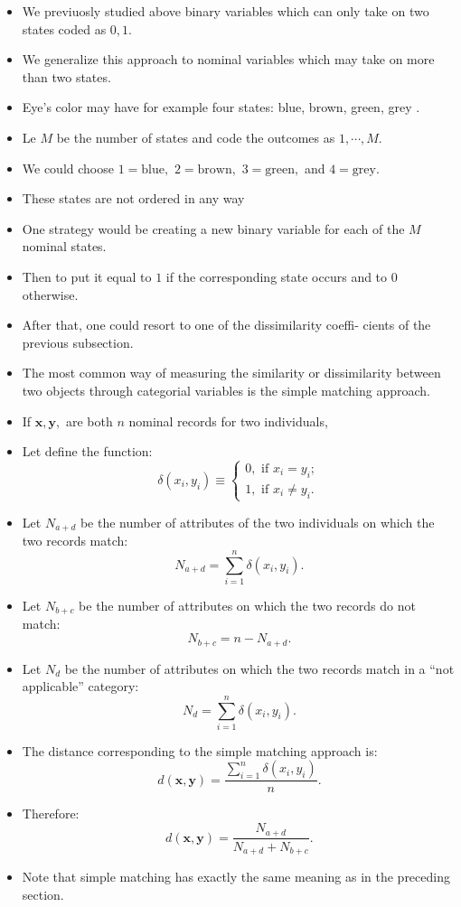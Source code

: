 \documentclass[
]{article}
\begin{document}
\begin{itemize}
\item
  We previuosly studied above binary variables which can only take on
  two states coded as \(0,1\).
\item
  We generalize this approach to nominal variables which may take on
  more than two states.
\item
  Eye's color may have for example four states: blue, brown, green, grey
  .
\item
  Le \(M\) be the number of states and code the outcomes as
  \(1, \cdots, M\).
\item
  We could choose \(1 =\text{blue},\) \(2 =\text{brown},\)
  \(3 =\text{green},\) and \(4 =\text{grey}\).
\item
  These states are not ordered in any way
\item
  One strategy would be creating a new binary variable for each of the
  \(M\) nominal states.
\item
  Then to put it equal to \(1\) if the corresponding state occurs and to
  \(0\) otherwise.
\item
  After that, one could resort to one of the dissimilarity coeffi-
  cients of the previous subsection.
\item
  The most common way of measuring the similarity or dissimilarity
  between two objects through categorial variables is the simple
  matching approach.
\item
  If \(\mathbf{x},\mathbf{y},\) are both \(n\) nominal records for two
  individuals,
\item
  Let define the function: \[\delta(x_i,y_i)\equiv \begin{cases}0,
  \text{ if } x_i=y_i;\\1,\text{ if } x_i \neq y_i.\end{cases}\]
\item
  Let \(N_{a+d}\) be the number of attributes of the two individuals on
  which the two records match: \[N_{a+d}=\sum_{i=1}^n\delta(x_i,y_i).\]
\item
  Let \(N_{b+c}\) be the number of attributes on which the two records
  do not match: \[N_{b+c}= n - N_{a+d}.\]
\item
  Let \(N_d\) be the number of attributes on which the two records match
  in a ``not applicable'' category:
  \[N_{d}=\sum_{i=1}^n\delta(x_i,y_i).\]
\item
  The distance corresponding to the simple matching approach is: \[
  d(\mathbf{x},\mathbf{y})=\frac{\sum_{i=1}^n\delta(x_i,y_i)}{n}.
  \]
\item
  Therefore:
  \[d(\mathbf{x},\mathbf{y})=\frac{N_{a+d}}{N_{a+d}+N_{b+c}}.\]
\item
  Note that simple matching has exactly the same meaning as in the
  preceding section.
\end{itemize}
\end{document}
